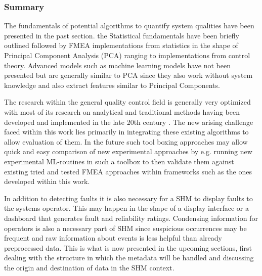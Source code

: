 \newpage

\subsubsection{Summary}
The fundamentals of potential algorithms to quantify system qualities have been presented in the past section. the Statistical fundamentals have been briefly outlined followed by FMEA implementations from statistics in the shape of Principal Component Analysis (PCA) ranging to implementations from control theory. Advanced models such as machine learning models have not been presented but are generally similar to PCA since they also work without system knowledge and also extract features similar to Principal Components.



The research within the general quality control field is generally very optimized with most of its research on analytical and traditional methods having been developed and implemented in the late 20th century \cite{isermann_fault-diagnosis_2011}. The new arising challenge faced within this work lies primarily in integrating these existing algorithms to allow evaluation of them. In the future such tool boxing approaches may allow quick and easy comparison of new experimental approaches by e.g. running new experimental ML-routines in such a toolbox to then validate them against existing tried and tested FMEA approaches within frameworks such as the ones developed within this work.

In addition to detecting faults it is also necessary for a SHM to display faults to the systems operator. This may happen in the shape of a display interface or a dashboard that generates fault and reliability ratings. Condensing information for operators is also a necessary part of SHM since suspicious occurrences may be frequent and raw information about events is less helpful than already preprocessed data. This is what is now presented in the upcoming sections, first dealing with the structure in which the metadata will be handled and discussing the origin and destination of data in the SHM context.

